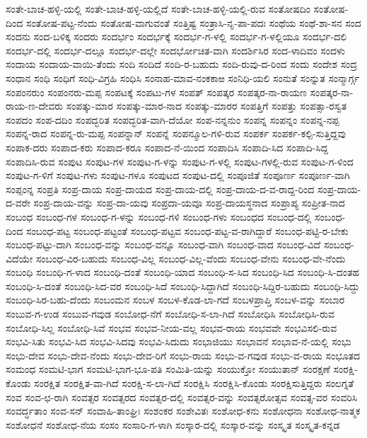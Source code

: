 ಸಂತೇ-ಬಾಚ-ಹಳ್ಳಿ-ಯಲ್ಲಿ
ಸಂತೇ-ಬಾಚ-ಹಳ್ಳಿ-ಯಲ್ಲಿದೆ
ಸಂತೇ-ಬಾಚ-ಹಳ್ಳಿ-ಯಲ್ಲಿ-ರುವ
ಸಂತೋಷದಿಂ
ಸಂತೋಷ-ದಿಂದ
ಸಂತೋಷ-ಪಟ್ಟ-ನೆಂದು
ಸಂತೋಷ-ವಾಗುವಂತೆ
ಸಂತ್ತಿಷ್ಟ
ಸಂತ್ರಾಸಿ-ನೃ-ಪಾ-ಪದಃ
ಸಂಥೆಯ
ಸಂಥೆ-ಶಾ-ಸನ
ಸಂದ
ಸಂದನು
ಸಂದ-ಬಳಿಕ್ಕ
ಸಂದರು
ಸಂದರ್ಭಂ
ಸಂದರ್ಭಕ್ಕೆ
ಸಂದರ್ಭ-ಗ-ಳಲ್ಲಿ
ಸಂದರ್ಭ-ಗ-ಳಲ್ಲಿಯೂ
ಸಂದರ್ಭ-ದಲಿ
ಸಂದರ್ಭ-ದಲ್ಲಿ
ಸಂದರ್ಭ-ದಲ್ಲೂ
ಸಂದರ್ಭ-ದಲ್ಲೇ
ಸಂದರ್ಭೋಚಿತ-ವಾಗಿ
ಸಂದರ್ಶಿಸಿರ
ಸಂದ-ಳಾದಿವಂ
ಸಂದಳು
ಸಂದಾಯ
ಸಂದಾಯ-ವಾಯಿ-ತೆಂದು
ಸಂದಿ
ಸಂದಿದೆ
ಸಂದಿ-ರ-ಬಹುದು
ಸಂದಿ-ರುವು-ದ-ರಿಂದ
ಸಂದು
ಸಂದೇಶ
ಸಂದ್ರ
ಸಂಧಾನ
ಸಂಧಿ
ಸಂಧಿಗೆ
ಸಂಧಿ-ವಿಗ್ರಹಿ
ಸಂಧಿಸಿ
ಸಂನಾಹ-ಮಾವ-ನಂಕಕಾಱ
ಸಂನಿಧಿ-ಯಲಿ
ಸಂನುತೆ
ಸಂನ್ನುತ
ಸಂನ್ಮಾರ್ಗ್ಗ
ಸಂಪಂನರುಂ
ಸಂಪಂನರು-ಮಪ್ಪ
ಸಂಪಟಕ್ಕೆ
ಸಂಪಟು-ಗಳ
ಸಂಪತ್
ಸಂಪತ್ಕರ
ಸಂಪತ್ಕರ-ನಾ-ರಾಯಣ
ಸಂಪತ್ಕರ-ನಾ-ರಾಯ-ಣ-ದೇವರು
ಸಂಪತ್ಕು-ಮಾರ
ಸಂಪತ್ಕು-ಮಾರ-ನಾದ
ಸಂಪತ್ಕು-ಮಾರರ
ಸಂಪತ್ತಿಗೆ
ಸಂಪತ್ತು
ಸಂಪತ್ಸಾ-ರಸ್ವತ
ಸಂಪದಂ
ಸಂಪ-ದದಿಂ
ಸಂಪದ್ಭರಿತ
ಸಂಪದ್ಭರಿತ-ವಾಗಿ-ದೆಯೋ
ಸಂಪ-ನನ್ನನುಂ
ಸಂಪನ್ನ
ಸಂಪನ್ನಂ
ಸಂಪನ್ನ-ನಪ್ಪ
ಸಂಪನ್ನ-ರಾದ
ಸಂಪನ್ನ-ರು-ಮಪ್ಪ
ಸಂಪನ್ನಾನ್
ಸಂಪನ್ನೆ
ಸಂಪನ್ಮೂಲ-ಗಳಿ-ರುವ
ಸಂಪರ್ಕ
ಸಂಪರ್ಕ-ಕಲ್ಪಿ-ಸುತ್ತಿದ್ದವು
ಸಂಪಾಕ-ದರು
ಸಂಪಾದ-ಕರು
ಸಂಪಾದ-ಕರೂ
ಸಂಪಾದ-ನೆ-ಯಿಂದ
ಸಂಪಾದಿಸಿ
ಸಂಪಾದಿ-ಸಿದ
ಸಂಪಾದಿ-ಸಿದ್ದ
ಸಂಪಾದಿಸಿ-ರುವ
ಸಂಪುಟ
ಸಂಪುಟ-ಗಳ
ಸಂಪುಟ-ಗ-ಳನ್ನು
ಸಂಪುಟ-ಗ-ಳಲ್ಲಿ
ಸಂಪುಟ-ಗಳಲ್ಲಿ-ರುವ
ಸಂಪುಟ-ಗ-ಳಿಂದ
ಸಂಪುಟ-ಗ-ಳಿಗೆ
ಸಂಪುಟ-ಗಳು
ಸಂಪುಟ-ಗಳೂ
ಸಂಪುಟದ
ಸಂಪುಟ-ದಲ್ಲಿ
ಸಂಪೂಜಿತೆ
ಸಂಪೂರ್ಣ
ಸಂಪೂರ್ಣ-ವಾಗಿ
ಸಂಪ್ಪಂನ್ನ
ಸಂಪ್ರತಿ
ಸಂಪ್ರ-ದಾಯ
ಸಂಪ್ರ-ದಾಯದ
ಸಂಪ್ರ-ದಾಯ-ದಲ್ಲಿ
ಸಂಪ್ರ-ದಾಯ-ದ-ವ-ರಾದ್ದ-ರಿಂದ
ಸಂಪ್ರ-ದಾಯ-ದ-ವರೇ
ಸಂಪ್ರ-ದಾಯ-ವನ್ನು
ಸಂಪ್ರ-ದಾ-ಯವು
ಸಂಪ್ರದಾ-ಯವೂ
ಸಂಪ್ರ-ದಾಯಸ್ಥನಾದ
ಸಂಪ್ರಾಪ್ಯ
ಸಂಪ್ರೀತ-ನಾದ
ಸಂಬಂಧ
ಸಂಬಂಧ-ಗಳ
ಸಂಬಂಧ-ಗ-ಳನ್ನು
ಸಂಬಂಧ-ಗಳಿ
ಸಂಬಂಧ-ಗಳು
ಸಂಬಂಧದ
ಸಂಬಂಧ-ದಲ್ಲಿ
ಸಂಬಂಧ-ದಿಂದ
ಸಂಬಂಧ-ಪಟ್ಟ
ಸಂಬಂಧ-ಪಟ್ಟಂತೆ
ಸಂಬಂಧ-ಪಟ್ಟವ
ಸಂಬಂಧ-ಪಟ್ಟ-ವ-ರಾಗಿದ್ದಾರೆ
ಸಂಬಂಧ-ಪಟ್ಟಿ-ರ-ಬೇಕು
ಸಂಬಂಧ-ಪಟ್ಟು-ದಾಗಿ
ಸಂಬಂಧ-ವನ್ನು
ಸಂಬಂಧ-ವನ್ನೂ
ಸಂಬಂಧ-ವಾಗಿ
ಸಂಬಂಧ-ವಾದ
ಸಂಬಂಧ-ವಿದೆ
ಸಂಬಂಧ-ವಿದೆಯೇ
ಸಂಬಂಧ-ವಿರ-ಬಹುದು
ಸಂಬಂಧ-ವಿಲ್ಲ
ಸಂಬಂಧ-ವಿಲ್ಲ-ವೆಂದು
ಸಂಬಂಧ-ವೇನು
ಸಂಬಂಧ-ವೇ-ನೆಂದು
ಸಂಬಂಧಿ
ಸಂಬಂಧಿ-ಗ-ಳಾದ
ಸಂಬಂಧಿ-ದಂತೆ
ಸಂಬಂಧಿ-ಯಾದ
ಸಂಬಂಧಿ-ಸ-ಸಿದ
ಸಂಬಂಧಿ-ಸಿದ
ಸಂಬಂಧಿ-ಸಿ-ದಂತಹ
ಸಂಬಂಧಿ-ಸಿ-ದಂತೆ
ಸಂಬಂಧಿ-ಸಿದ-ವರ
ಸಂಬಂಧಿ-ಸಿದೆ
ಸಂಬಂಧಿ-ಸಿದ್ದಾಗಿದೆ
ಸಂಬಂಧಿ-ಸಿದ್ದಿರ-ಬಹುದು
ಸಂಬಂಧಿ-ಸಿದ್ದು
ಸಂಬಂಧಿ-ಸಿರ-ಬಹು-ದೆಂದು
ಸಂಬಂಮನ
ಸಂಬಳ
ಸಂಬಳ-ಕೊಡ-ಲಾ-ಗದೆ
ಸಂಬಳಪ್ರಾಪ್ತಿ
ಸಂಬಳ-ವನ್ನು
ಸಂಬಾರ
ಸಂಬುವ-ಗ-ಉಡ
ಸಂಬುವ-ಗವುಡ
ಸಂಬೋಧ-ನೆಗೆ
ಸಂಬೋಧಿ-ಸ-ಲಾ-ಗಿದೆ
ಸಂಬೋಧಿಸಿ
ಸಂಬೋಧಿಸಿ-ರುವ
ಸಂಬೋಧಿ-ಸಿಲ್ಲ
ಸಂಬೋಧಿ-ಸಿವೆ
ಸಂಭವ
ಸಂಭವ-ನೀಯ-ವಲ್ಲ
ಸಂಭವ-ರಾಯ
ಸಂಭವವೇ
ಸಂಭವಿಸಲಿ-ರುವ
ಸಂಭವಿ-ಸಿತು
ಸಂಭವಿ-ಸಿದ
ಸಂಭವಿ-ಸಿದವು
ಸಂಭವಿ-ಸಿದುದು
ಸಂಭಾಜಿಯು
ಸಂಭಾವನೆ
ಸಂಭಾವ-ನೆ-ಯಲ್ಲಿ
ಸಂಭು
ಸಂಭು-ದೇವ
ಸಂಭು-ದೇವ-ನೆಂದು
ಸಂಭು-ದೇವ-ರಿಗೆ
ಸಂಭು-ರಾಯ
ಸಂಭು-ವ-ಗವುಡ
ಸಂಭು-ವ-ರಾಯ
ಸಂಭೂತದ
ಸಂಮಂಧ
ಸಂಮಟಿ-ಭಾಗ
ಸಂಮಟಿ-ಭಾಗ-ಭೂ-ಪತಿ
ಸಂಮಿತಿ-ಯನ್ನು
ಸಂಯುಕ್ತೋ
ಸಂಯುತಾನ್
ಸಂರಕ್ಷಣೆ
ಸಂರಕ್ಷಿ-ಕೊಂಡು
ಸಂರಕ್ಷಿತ
ಸಂರಕ್ಷಿತ-ವಾ-ಗಿದೆ
ಸಂರಕ್ಷಿ-ಸ-ಲಾ-ಗಿದೆ
ಸಂರಕ್ಷಿಸಿ
ಸಂರಕ್ಷಿಸಿ-ಕೊಂಡು
ಸಂರಕ್ಷಿಸುತ್ತಿದ್ದರು
ಸಂಲಗ್ನತೆ
ಸಂವ
ಸಂವ-ಛ-ರಾಗಿ
ಸಂವತ್ಸರ
ಸಂವತ್ಸರದ
ಸಂವತ್ಸರ-ದಲ್ಲಿ
ಸಂವತ್ಸರ-ವನ್ನು
ಸಂವತ್ಸರೋತ್ಸವ
ಸಂವತ್ಸ-ವರ
ಸಂವರಿಸಿ
ಸಂವರ್ದ್ಧತಾಂ
ಸಂವ-ಸನ್
ಸಂವಾಹಿ-ತಾಂಘ್ರಿಃ
ಸಂಶಂಕರ
ಸಂಶೇವಿತಃ
ಸಂಶೋಧ-ಕನು
ಸಂಶೋಧನಾ
ಸಂಶೋಧ-ನಾತ್ಮಕ
ಸಂಶೋಧನೆ
ಸಂಶೋಧ-ನೆಯ
ಸಂಸಂ
ಸಂಸಾರಿ-ಗ-ಳಾಗಿ
ಸಂಸ್ಕಾರ-ದಲ್ಲಿ
ಸಂಸ್ಕಾರ-ವನ್ನು
ಸಂಸ್ಕೃತ
ಸಂಸ್ಕೃತ-ಕನ್ನಡ
